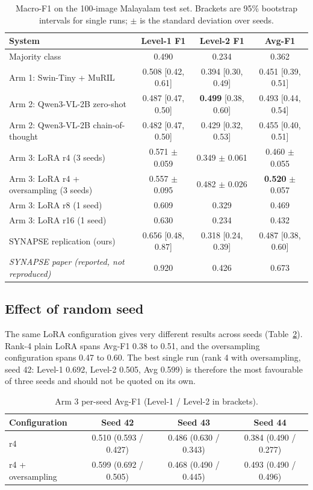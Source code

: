 \begin{table}[h]
\centering
\caption{Macro-F1 on the 100-image Malayalam test set. Brackets are 95\% bootstrap intervals for single runs; $\pm$ is the standard deviation over seeds.}
\label{tab:main}
\small
\begin{tabular}{p{6.2cm}ccc}
\toprule
System & Level-1 F1 & Level-2 F1 & Avg-F1 \\
\midrule
Majority class & 0.490 & 0.234 & 0.362 \\
Arm 1: Swin-Tiny + MuRIL & 0.508 [0.42, 0.61] & 0.394 [0.30, 0.49] & 0.451 [0.39, 0.51] \\
Arm 2: Qwen3-VL-2B zero-shot & 0.487 [0.47, 0.50] & \textbf{0.499} [0.38, 0.60] & 0.493 [0.44, 0.54] \\
Arm 2: Qwen3-VL-2B chain-of-thought & 0.482 [0.47, 0.50] & 0.429 [0.32, 0.53] & 0.455 [0.40, 0.51] \\
Arm 3: LoRA r4 (3 seeds) & 0.571 $\pm$ 0.059 & 0.349 $\pm$ 0.061 & 0.460 $\pm$ 0.055 \\
Arm 3: LoRA r4 + oversampling (3 seeds) & 0.557 $\pm$ 0.095 & 0.482 $\pm$ 0.026 & \textbf{0.520} $\pm$ 0.057 \\
Arm 3: LoRA r8 (1 seed) & 0.609 & 0.329 & 0.469 \\
Arm 3: LoRA r16 (1 seed) & 0.630 & 0.234 & 0.432 \\
SYNAPSE replication (ours) & 0.656 [0.48, 0.87] & 0.318 [0.24, 0.39] & 0.487 [0.38, 0.60] \\
\midrule
\emph{SYNAPSE paper (reported, not reproduced)} & 0.920 & 0.426 & 0.673 \\
\bottomrule
\end{tabular}
\end{table}

\subsection{Effect of random seed}

The same LoRA configuration gives very different results across seeds (Table~\ref{tab:seeds}). Rank-4 plain LoRA spans Avg-F1 0.38 to 0.51, and the oversampling configuration spans 0.47 to 0.60. The best single run (rank 4 with oversampling, seed 42: Level-1 0.692, Level-2 0.505, Avg 0.599) is therefore the most favourable of three seeds and should not be quoted on its own.

\begin{table}[h]
\centering
\caption{Arm 3 per-seed Avg-F1 (Level-1 / Level-2 in brackets).}
\label{tab:seeds}
\small
\begin{tabular}{lccc}
\toprule
Configuration & Seed 42 & Seed 43 & Seed 44 \\
\midrule
r4 & 0.510 (0.593 / 0.427) & 0.486 (0.630 / 0.343) & 0.384 (0.490 / 0.277) \\
r4 + oversampling & 0.599 (0.692 / 0.505) & 0.468 (0.490 / 0.445) & 0.493 (0.490 / 0.496) \\
\bottomrule
\end{tabular}
\end{table}

